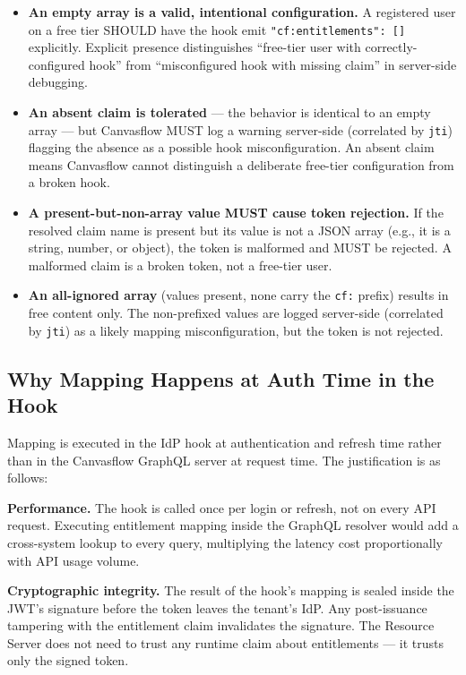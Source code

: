 \begin{itemize}
  \item \textbf{An empty array is a valid, intentional configuration.} A registered user
    on a free tier SHOULD have the hook emit \texttt{"cf:entitlements": []} explicitly.
    Explicit presence distinguishes ``free-tier user with correctly-configured hook'' from
    ``misconfigured hook with missing claim'' in server-side debugging.

  \item \textbf{An absent claim is tolerated} --- the behavior is identical to an empty
    array --- but Canvasflow MUST log a warning server-side (correlated by \texttt{jti})
    flagging the absence as a possible hook misconfiguration. An absent claim means
    Canvasflow cannot distinguish a deliberate free-tier configuration from a broken hook.

  \item \textbf{A present-but-non-array value MUST cause token rejection.} If the
    resolved claim name is present but its value is not a JSON array (e.g., it is a
    string, number, or object), the token is malformed and MUST be rejected. A malformed
    claim is a broken token, not a free-tier user.

  \item \textbf{An all-ignored array} (values present, none carry the \texttt{cf:}
    prefix) results in free content only. The non-prefixed values are logged server-side
    (correlated by \texttt{jti}) as a likely mapping misconfiguration, but the token is
    not rejected.
\end{itemize}

\pagebreak

\subsection{Why Mapping Happens at Auth Time in the Hook}

Mapping is executed in the IdP hook at authentication and refresh time rather than in
the Canvasflow GraphQL server at request time. The justification is as follows:

\textbf{Performance.} The hook is called once per login or refresh, not on every API
request. Executing entitlement mapping inside the GraphQL resolver would add a
cross-system lookup to every query, multiplying the latency cost proportionally with
API usage volume.

\textbf{Cryptographic integrity.} The result of the hook's mapping is sealed inside the
JWT's signature before the token leaves the tenant's IdP. Any post-issuance tampering
with the entitlement claim invalidates the signature. The Resource Server does not need
to trust any runtime claim about entitlements --- it trusts only the signed token.

